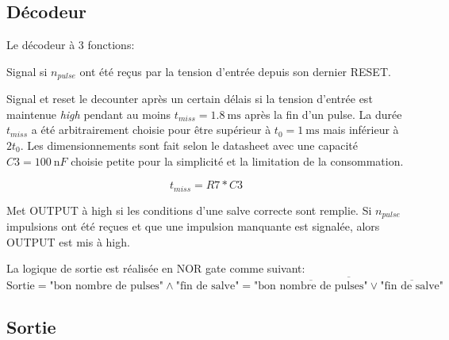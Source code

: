 \documentclass[french]{layout/Report}
\begin{document}
\subsection{Décodeur}
Le décodeur à 3 fonctions:

\begin{description}[leftmargin=!,labelwidth=4cm, labelindent=\parindent]
	\item[Down counter] Signal si $n_{pulse}$ ont été reçus par la tension d'entrée depuis son dernier RESET.
	\item[Missing pulse detector] Signal et reset le decounter après un certain délais si la tension d'entrée est maintenue \emph{high} pendant au moins $t_{miss} = \SI{1.8}{\milli\second}$ après la fin d'un pulse. La durée $t_{miss}$ a été arbitrairement choisie pour être supérieur à $t_0 = \SI{1}{\milli\second}$ mais inférieur à $2t_0$. Les dimensionnements sont fait selon le datasheet \cite{TLC555} avec une capacité $\mathit{C3} = \SI{100}{\nano F}$ choisie petite pour la simplicité et la limitation de la consommation.

		\begin{equation*}
			t_{miss} = \mathit{R7}*\mathit{C3}
		\end{equation*}

	\item[Logic] Met OUTPUT à high si les conditions d'une salve correcte sont remplie. Si $n_{pulse}$ impulsions ont été reçues et que une impulsion manquante est signalée, alors OUTPUT est mis à high. 
\end{description}

La logique de sortie est réalisée en NOR gate comme suivant:
\begin{equation*}
\text{Sortie} = \text{"bon nombre de pulses"} \land \text{"fin de salve"} = \overline{\overline{\text{"bon nombre de pulses"}} \lor \overline{\text{"fin de salve"}}}
\end{equation*}

\subsection{Sortie}

\end{document}
